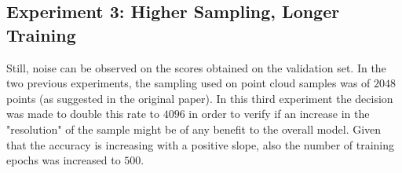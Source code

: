\documentclass[11pt,a4paper]{article}
\begin{document}
\subsection{Experiment 3: Higher Sampling, Longer Training}
Still, noise can be observed on the scores obtained on the validation set. In the two previous experiments, the sampling used on point cloud samples was of $2048$ points (as suggested in the original paper). In this third experiment the decision was made to double this rate to $4096$ in order to verify if an increase in the "resolution" of the sample might be of any benefit to the overall model. Given that the accuracy is increasing with a positive slope, also the number of training epochs was increased to $500$.
\begin{figure}[H]
    \centering
    \qquad

\end{figure}
\end{document}
